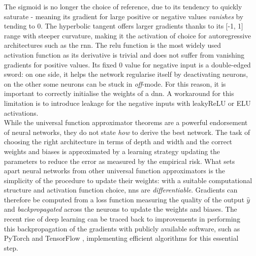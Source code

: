 The sigmoid is no longer the choice of reference, due to its tendency to quickly saturate - meaning its gradient for large positive or negative values \textit{vanishes} by tending to 0. The hyperbolic tangent offers larger gradients thanks to its [-1, 1] range with steeper curvature, making it the activation of choice for autoregressive architectures such as the \gls{rnn}. The \gls{relu} function is the most widely used activation function as its derivative is trivial and does not suffer from vanishing gradients for positive values. Its fixed 0 value for negative input is a double-edged sword: on one side, it helps the network regularise itself by deactivating neurons, on the other some neurons can be stuck in \textit{off}-mode. For this reason, it is important to correctly initialise the weights of a \gls{dnn}. A workaround for this limitation is to introduce leakage for the negative inputs with leakyReLU or ELU activations.\\

While the universal function approximator theorems are a powerful endorsement of neural networks, they do not state \textit{how} to derive the best network. The task of choosing the right architecture in terms of depth and width and the correct weights and biases is approximated by a learning strategy updating the parameters to reduce the error as measured by the empirical risk. What sets apart neural networks from other universal function approximators is the simplicity of the procedure to update their weights: with a suitable computational structure and activation function choice, \glspl{nn} are \textit{differentiable}. Gradients can therefore be computed from a loss function measuring the quality of the output $\hat{y}$ and \textit{backpropagated} across the neurons to update the weights and biases. The recent rise of deep learning can be traced back to improvements in performing this backpropagation of the gradients with publicly available software, such as PyTorch \cite{pytorch} and TensorFlow \cite{tensorflow2015-whitepaper}, implementing efficient algorithms for this essential step. \\


